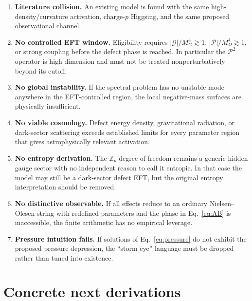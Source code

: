 \documentclass[11pt]{article}
\newcommand{\Geff}{\mathcal G}
\newcommand{\Pontryagin}{\mathcal P}
\begin{document}
\begin{enumerate}[leftmargin=1.7em]
    \item \textbf{Literature collision.}  An existing model is found with the same high-density/curvature activation, charge-$p$ Higgsing, and the same proposed observational channel.
    \item \textbf{No controlled EFT window.}  Eligibility requires $|\Geff|/M_G^4\gtrsim1$, $|\Pontryagin|/M_\Omega^4\gtrsim1$, or strong coupling before the defect phase is reached.  In particular the $\Pontryagin^2$ operator is high dimension and must not be treated nonperturbatively beyond its cutoff.
    \item \textbf{No global instability.}  If the spectral problem has no unstable mode anywhere in the EFT-controlled region, the local negative-mass surfaces are physically insufficient.
    \item \textbf{No viable cosmology.}  Defect energy density, gravitational radiation, or dark-sector scattering exceeds established limits for every parameter region that gives astrophysically relevant activation.
    \item \textbf{No entropy derivation.}  The $\mathbb Z_p$ degree of freedom remains a generic hidden gauge sector with no independent reason to call it entropic.  In that case the model may still be a dark-sector defect EFT, but the original entropy interpretation should be removed.
    \item \textbf{No distinctive observable.}  If all effects reduce to an ordinary Nielsen--Olesen string with redefined parameters and the phase in Eq.~\eqref{eq:AB} is inaccessible, the finite arithmetic has no empirical leverage.
    \item \textbf{Pressure intuition fails.}  If solutions of Eq.~\eqref{eq:pressure} do not exhibit the proposed pressure depression, the ``storm eye'' language must be dropped rather than tuned into existence.
\end{enumerate}

\section{Concrete next derivations}
\end{document}
